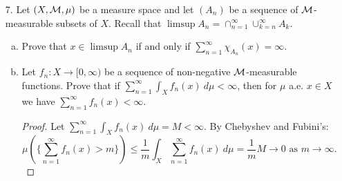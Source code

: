 \begin{itemize}
\begin{enumerate}[(a)]
\begin{proof}
These functions tend a.e. to $0$, yet they all integrate to $-1$.
\end{proof}

\item Prove the following extension of Fatou’s Lemma: Suppose $h : X \rightarrow [0, \infty)$ is
an $\calm$-measurable, integrable function, and $\{f_n\}_{n=1}^{\infty}$ is a sequence of $\calm$-measurable functions so that $-h \leq f_n$ for all $n \in \bbn$. Prove that 
$$\int (\liminf_{n} f_n) \ d\mu \leq \liminf_{n} \int f_n \ d\mu.$$
\begin{proof}
By the condition stated, $f_n + h \geq 0$, so apply Fatou's to this:
$$\int \liminf_{n} (f_n + h) \ d\mu \leq \liminf_{n} \int (f_n + h) \ d\mu.$$
Expanding and subtracting the integrals of $h$ proves the problem.
\end{proof}

\item Prove that the extended Fatou’s Lemma (as stated in (c)) does not apply to
the example in (b). Explain why.
\begin{proof}
If $-h \leq -\frac{1}{n} \chi_{[0,n]}$, then $h \geq \frac{1}{n} \chi_{[0,n]}$. 
We can bound this with $h \geq \frac{1}{n} \chi_{[n-1,n]}$, so since these indicators are disjoint, $h \geq \sum_{n=1}^{\infty} \frac{1}{n} \chi_{[n-1,n]}$. But this sum has infinite integral. 
\end{proof}
\end{enumerate}








\item[7.] 
\label{q:w21-7} Let $(X,\mathcal{M}, \mu)$ be a measure space and let $(A_n)$ be a sequence of $\calm$-measurable
subsets of $X$. Recall that $\limsup A_n = \cap_{n=1}^{\infty} \cup_{k=n}^{\infty} A_k$.
\begin{enumerate}[(a)]
\item Prove that $x \in \limsup A_n$ if and only if $\sum_{n=1}^{\infty} \chi_{A_n}(x) = \infty$.


\item Let $f_n : X \rightarrow [0,\infty)$ be a sequence of non-negative $\calm$-measurable functions.
Prove that if $\sum_{n=1}^{\infty} \int_{X} f_n(x) \ d\mu < \infty$, then for $\mu$ a.e. $x \in X$ we have $\sum_{n=1}^{\infty} f_n(x) < \infty.$
\begin{proof}
Let $\sum_{n=1}^{\infty} \int_{X} f_n(x) \ d\mu = M < \infty$. 
By Chebyshev and Fubini's: 
$$\mu\left(\{\sum_{n=1}^{\infty} f_n(x) > m\}\right) \leq \frac{1}{m} \int_{X} \sum_{n=1}^{\infty}  f_n(x) \ d\mu = \frac{1}{m} M \rightarrow 0 \text{ as } m\rightarrow\infty.$$
\end{proof}


\end{enumerate}
\end{itemize}
